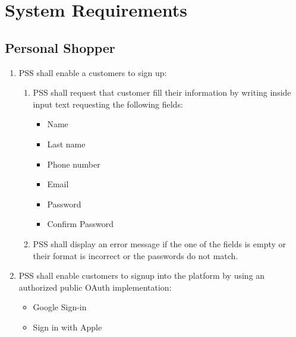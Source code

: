 \section{System Requirements}
\subsection{Personal Shopper}
\begin{enumerate}[label=SY-\arabic*]
    \item PSS shall enable a customers to sign up:
    \begin{enumerate}[label=SY1-\arabic*]
        \item PSS shall request that customer fill their information by
        writing inside input text requesting the following fields:
        \begin{itemize}
            \item Name
            \item Last name
            \item Phone number
            \item Email
            \item Password
            \item Confirm Password
        \end{itemize}
        \item PSS shall display an error message if the one of the fields is 
        empty or their format is incorrect or the passwords do not match.
    \end{enumerate}
    \item PSS shall enable customers to signup into the platform by using an 
    authorized public OAuth implementation:
    \begin{itemize}
        \item Google Sign-in \cite{google-sign-in}
        \item Sign in with Apple \cite{sign-in-with-apple}
    \end{itemize}


\end{enumerate}
